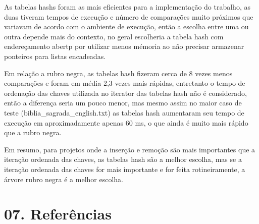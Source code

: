\documentclass{article}
\begin{document}
As tabelas hashs foram as mais eficientes para a implementação do trabalho, as duas tiveram tempos de execução e número de comparações muito próximos que variavam de acordo com o ambiente de execução, então a escolha entre uma ou outra depende mais do contexto, no geral escolheria a tabela hash com endereçamento abertp por utilizar menos mémoria ao não precisar armazenar ponteiros para listas encadeadas.

Em relação a rubro negra, as tabelas hash fizeram cerca de 8 vezes menos comparações e foram em média 2,3 vezes mais rápidas, entretanto o tempo de ordenação das chaves utilizada no iterator das tabelas hash não é considerado, então a diferença seria um pouco menor, mas mesmo assim no maior caso de teste (biblia\_sagrada\_english.txt) as tabelas hash aumentaram seu tempo de execução em aproximadamente apenas 60 ms, o que ainda é muito mais rápido que a rubro negra.

Em resumo, para projetos onde a inserção e remoção são mais importantes que a iteração ordenada das chaves, as tabelas hash são a melhor escolha, mas se a iteração ordenada das chaves for mais importante e for feita rotineiramente, a árvore rubro negra é a melhor escolha.

\section*{07. Referências}
\end{document}
